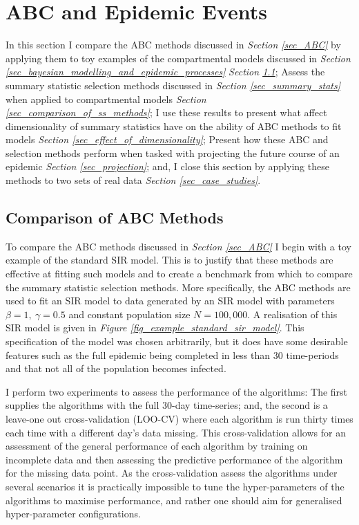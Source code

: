 \documentclass[11pt,a4paper]{article}
\theoremstyle{break}
\begin{document}
\newpage
\section{ABC and Epidemic Events}\label{sec_abc_and_epidemic_events}

  \par In this section I compare the ABC methods discussed in \textit{Section \ref{sec_ABC}} by applying them to toy examples of the compartmental models discussed in \textit{Section \ref{sec_bayesian_modelling_and_epidemic_processes}} \textit{Section \ref{sec_comparison_of_abc_methods}}; Assess the summary statistic selection methods discussed in \textit{Section \ref{sec_summary_stats}} when applied to compartmental models \textit{Section \ref{sec_comparison_of_ss_methods}}; I use these results to present what affect dimensionality of summary statistics have on the ability of ABC methods to fit models \textit{Section \ref{sec_effect_of_dimensionality}}; Present how these ABC and selection methods perform when tasked with projecting the future course of an epidemic \textit{Section \ref{sec_projection}}; and, I close this section by applying these methods to two sets of real data \textit{Section \ref{sec_case_studies}}.

\subsection{Comparison of ABC Methods}\label{sec_comparison_of_abc_methods}

  \par To compare the ABC methods discussed in \textit{Section \ref{sec_ABC}} I begin with a toy example of the standard SIR model. This is to justify that these methods are effective at fitting such models and to create a benchmark from which to compare the summary statistic selection methods. More specifically, the ABC methods are used to fit an SIR model to data generated by an SIR model with parameters $\beta=1,\ \gamma=0.5$ and constant population size $N=100,000$. A realisation of this SIR model is given in \textit{Figure \ref{fig_example_standard_sir_model}}. This specification of the model was chosen arbitrarily, but it does have some desirable features such as the full epidemic being completed in less than 30 time-periods and that not all of the population becomes infected.

  \par I perform two experiments to assess the performance of the algorithms: The first supplies the algorithms with the full 30-day time-series; and, the second is a leave-one out cross-validation (LOO-CV) where each algorithm is run thirty times each time with a different day's data missing. This cross-validation allows for an assessment of the general performance of each algorithm by training on incomplete data and then assessing the predictive performance of the algorithm for the missing data point. As the cross-validation assess the algorithms under several scenarios it is practically impossible to tune the hyper-parameters of the algorithms to maximise performance, and rather one should aim for generalised hyper-parameter configurations.
\end{document}
